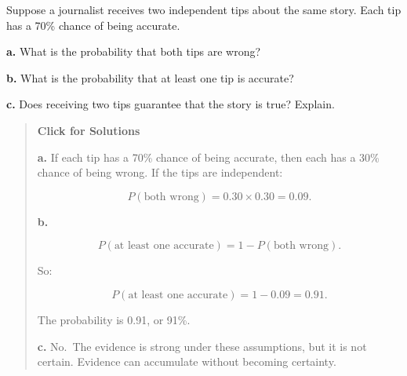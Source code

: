 \documentclass[
  letterpaper,
  DIV=11,
  numbers=noendperiod]{scrreprt}
\begin{document}
\begin{tcolorbox}[enhanced jigsaw, arc=.35mm, bottomrule=.15mm, bottomtitle=1mm, breakable, colback=white, colbacktitle=quarto-callout-note-color!10!white, colframe=quarto-callout-note-color-frame, coltitle=black, left=2mm, leftrule=.75mm, opacityback=0, opacitybacktitle=0.6, rightrule=.15mm, title=\textcolor{quarto-callout-note-color}{\faInfo}\hspace{0.5em}{Question 11}, titlerule=0mm, toprule=.15mm, toptitle=1mm]

Suppose a journalist receives two independent tips about the same story.
Each tip has a 70\% chance of being accurate.

\textbf{a.} What is the probability that both tips are wrong?

\textbf{b.} What is the probability that at least one tip is accurate?

\textbf{c.} Does receiving two tips guarantee that the story is true?
Explain.

\begin{quote}
\textbf{Click for Solutions}

\textbf{a.} If each tip has a 70\% chance of being accurate, then each
has a 30\% chance of being wrong. If the tips are independent:

\[P(\text{both wrong}) = 0.30 \times 0.30 = 0.09.\]

\textbf{b.}

\[P(\text{at least one accurate}) = 1 - P(\text{both wrong}).\]

So:

\[P(\text{at least one accurate}) = 1 - 0.09 = 0.91.\]

The probability is 0.91, or 91\%.

\textbf{c.} No.~The evidence is strong under these assumptions, but it
is not certain. Evidence can accumulate without becoming certainty.
\end{quote}

\end{tcolorbox}
\end{document}
